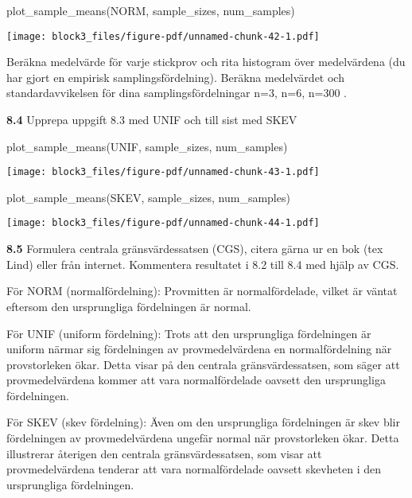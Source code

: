 \documentclass[
  letterpaper,
  DIV=11,
  numbers=noendperiod]{scrartcl}
\newenvironment{Shaded}{\begin{snugshade}}{\end{snugshade}}
\newcommand{\FunctionTok}[1]{\textcolor[rgb]{0.28,0.35,0.67}{#1}}
\newcommand{\NormalTok}[1]{\textcolor[rgb]{0.00,0.23,0.31}{#1}}
\begin{document}
\begin{Shaded}
\begin{Highlighting}[]
\FunctionTok{plot\_sample\_means}\NormalTok{(NORM, sample\_sizes, num\_samples)}
\end{Highlighting}
\end{Shaded}

\texttt{[image: block3\_files/figure-pdf/unnamed-chunk-42-1.pdf]}

Beräkna medelvärde för varje stickprov och rita histogram över
medelvärdena (du har gjort en empirisk samplingsfördelning). Beräkna
medelvärdet och standardavvikelsen för dina samplingsfördelningar n=3,
n=6, n=300 .

\textbf{8.4} Upprepa uppgift 8.3 med UNIF och till sist med SKEV

\begin{Shaded}
\begin{Highlighting}[]
\FunctionTok{plot\_sample\_means}\NormalTok{(UNIF, sample\_sizes, num\_samples)}
\end{Highlighting}
\end{Shaded}

\texttt{[image: block3\_files/figure-pdf/unnamed-chunk-43-1.pdf]}

\begin{Shaded}
\begin{Highlighting}[]
\FunctionTok{plot\_sample\_means}\NormalTok{(SKEV, sample\_sizes, num\_samples)}
\end{Highlighting}
\end{Shaded}

\texttt{[image: block3\_files/figure-pdf/unnamed-chunk-44-1.pdf]}

\textbf{8.5} Formulera centrala gränsvärdessatsen (CGS), citera gärna ur
en bok (tex Lind) eller från internet. Kommentera resultatet i 8.2 till
8.4 med hjälp av CGS.

För NORM (normalfördelning): Provmitten är normalfördelade, vilket är
väntat eftersom den ursprungliga fördelningen är normal.

För UNIF (uniform fördelning): Trots att den ursprungliga fördelningen
är uniform närmar sig fördelningen av provmedelvärdena en
normalfördelning när provstorleken ökar. Detta visar på den centrala
gränsvärdessatsen, som säger att provmedelvärdena kommer att vara
normalfördelade oavsett den ursprungliga fördelningen.

För SKEV (skev fördelning): Även om den ursprungliga fördelningen är
skev blir fördelningen av provmedelvärdena ungefär normal när
provstorleken ökar. Detta illustrerar återigen den centrala
gränsvärdessatsen, som visar att provmedelvärdena tenderar att vara
normalfördelade oavsett skevheten i den ursprungliga fördelningen.
\end{document}
